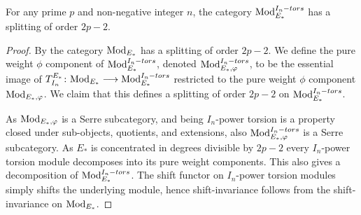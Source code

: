 \begin{lemma}
    \label{ch1:lm:splitting-torsion-modules}
    For any prime $p$ and non-negative integer $n$, the category $\mathrm{Mod}_{E_*}^{I_n-tors}$ has a splitting of order $2p-2$. 
\end{lemma}
\begin{proof}
    By \cite[8.1]{patchkoria-pstragowski_2021} the category $\mathrm{Mod}_{E_*}$ has a splitting of order $2p-2$. We define the pure weight $\phi$ component of $\mathrm{Mod}_{E_*}^{I_n-tors}$, denoted $\mathrm{Mod}_{E_*, \varphi}^{I_n-tors}$, to be the essential image of $T_{I_n}^{E_*}\colon \mathrm{Mod}_{E_*}\longrightarrow \mathrm{Mod}_{E_*}^{I_n-tors}$ restricted to the pure weight $\phi$ component $\mathrm{Mod}_{E_*, \varphi}$. We claim that this defines a splitting of order $2p-2$ on $\mathrm{Mod}_{E_*}^{I_n-tors}$. 

    As $\mathrm{Mod}_{E_*, \varphi}$ is a Serre subcategory, and being $I_n$-power torsion is a property closed under sub-objects, quotients, and extensions, also $\mathrm{Mod}_{E_*, \varphi}^{I_n-tors}$ is a Serre subcategory. As $E_*$ is concentrated in degrees divisible by $2p-2$ every $I_n$-power torsion module decomposes into its pure weight components. This also gives a decomposition of $\mathrm{Mod}_{E_*}^{I_n-tors}$. The shift functor on $I_n$-power torsion modules simply shifts the underlying module, hence shift-invariance follows from the shift-invariance on $\mathrm{Mod}_{E_*}$. 

    
\end{proof}

